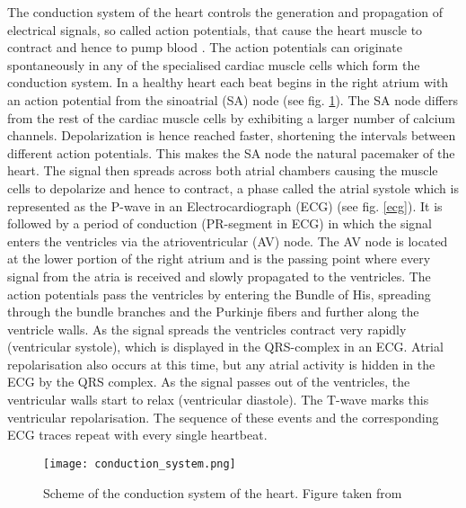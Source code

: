 \documentclass[type=dr, dr=rernat, accentcolor=tud7b,colorbacktitle, bigchapter, openright, twoside, 12pt ]{tudthesis}
\begin{document}
The conduction system of the heart controls the generation and propagation of electrical signals, so called action potentials, that cause 
the heart muscle to contract and hence to pump blood \cite{Med}. The action potentials can originate spontaneously in any of the specialised 
cardiac muscle cells which form the conduction system. In a healthy heart each beat begins in the right atrium with an action potential 
from the sinoatrial (SA) node (see fig. \ref{condsys}). The SA node differs from the rest of the cardiac muscle cells by exhibiting a larger 
number of calcium channels. Depolarization is hence reached faster, shortening the intervals between different action potentials. This makes 
the SA node the natural pacemaker of the heart.
The signal then spreads across both atrial chambers causing the muscle cells to depolarize and hence to contract, a phase called the atrial systole 
which is represented as the P-wave in an Electrocardiograph (ECG) (see fig. \ref{ecg}). It is followed by a period of conduction (PR-segment in ECG) in which 
the signal enters the ventricles via the atrioventricular (AV) node. The AV node is located at the lower portion of the right atrium and is 
the passing point where every signal from the atria is received and slowly propagated to the ventricles. The action potentials pass the 
ventricles 
by entering the Bundle of His, spreading through the bundle branches and the Purkinje fibers and further along the ventricle walls. As the 
signal spreads the ventricles contract very rapidly (ventricular systole), which is displayed in the QRS-complex in an ECG. Atrial 
repolarisation also occurs at this time, but any atrial activity is hidden in the ECG by the QRS complex. As the signal passes out of the 
ventricles, the ventricular walls start to relax (ventricular diastole). The T-wave marks this ventricular repolarisation. The sequence of 
these events and the corresponding ECG traces repeat with every single heartbeat.\newline

\vspace{-1.5cm}
\begin{figure}[H]
\begin{center}
\texttt{[image: conduction\_system.png]}
\caption{Scheme of the conduction system of the heart. Figure taken from \cite{amc}}
\label{condsys}
\end{center}
\end{figure}
\end{document}
